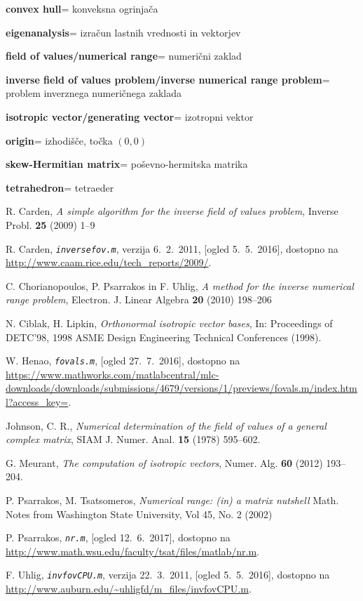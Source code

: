 \documentclass[12pt,a4paper]{amsart}
\theoremstyle{definition}
\theoremstyle{plain}
\newcommand{\geslo}[2]{\noindent\textbf{#1}\hspace*{3mm}\hangindent=\parindent\hangafter=1 #2}
\begin{document}
\geslo{convex hull}{konveksna ogrinjača}

\geslo{eigenanalysis}{izračun lastnih vrednosti in vektorjev}

\geslo{field of values/numerical range}{numerični zaklad}

\geslo{inverse field of values problem/inverse numerical range problem}{problem inverznega numeričnega zaklada}

\geslo{isotropic vector/generating vector}{izotropni vektor}

\geslo{origin}{izhodišče, točka $(0,0)$}

\geslo{skew-Hermitian matrix}{poševno-hermitska matrika}

\geslo{tetrahedron}{tetraeder}





\begin{thebibliography}{99}



R. Carden, \emph{A simple algorithm for the inverse field of values problem}, Inverse Probl. {\bf 25} (2009) 1--9

R. Carden, \emph{\texttt{inversefov.m}}, verzija 6.~2.~2011, [ogled 5.~5.~2016], dostopno na \url{http://www.caam.rice.edu/tech_reports/2009/}.

C. Chorianopoulos, P. Psarrakos in F. Uhlig, \emph{A method for the inverse numerical range problem}, Electron. J. Linear Algebra {\bf 20} (2010) 198--206

N. Ciblak, H. Lipkin, \emph{Orthonormal isotropic vector bases}, In: Proceedings of DETC'98, 1998 ASME Design Engineering Technical Conferences (1998).

W. Henao, \emph{\texttt{fovals.m}}, [ogled 27.~7.~2016], dostopno na \url{https://www.mathworks.com/matlabcentral/mlc-downloads/downloads/submissions/4679/versions/1/previews/fovals.m/index.html?access_key=}.

Johnson, C. R., \emph{Numerical determination of the field of values of a general complex matrix}, SIAM J. Numer. Anal. {\bf 15} (1978) 595--602.

G. Meurant, \emph{The computation of isotropic vectors}, Numer. Alg. {\bf 60} (2012) 193--204.

P. Psarrakos, M. Tsatsomeros, \emph{Numerical range: (in) a matrix nutshell} Math. Notes from Washington State University,  Vol 45, No. 2 (2002)

P. Psarrakos, \emph{\texttt{nr.m}}, [ogled 12.~6.~2017], dostopno na \url{http://www.math.wsu.edu/faculty/tsat/files/matlab/nr.m}.

F. Uhlig, \emph{\texttt{invfovCPU.m}}, verzija 22.~3.~2011, [ogled 5.~5.~2016], dostopno na \url{http://www.auburn.edu/~uhligfd/m_files/invfovCPU.m}.

\end{thebibliography}
\end{document}
